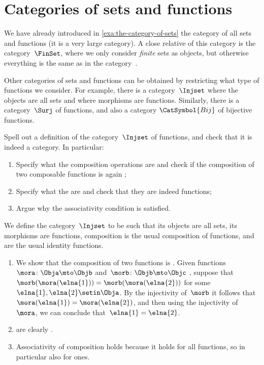 
\section{Categories of sets and functions}

We have already introduced in \cref{exa:the-category-of-sets} the category of all sets and functions (it is a very large category).
A close relative of this category is the category~$\FinSet$, where we only consider \emph{finite} sets as objects, but otherwise everything is the same as in the category~\Set.

Other categories of sets and functions can be obtained by restricting what type of functions we consider.
For example, there is a category~$\Injset$ where the objects are all sets and where morphisms are  functions.
Similarly, there is a category~$\Surj$ of  functions, and also a category $\CatSymbol{Bij}$ of bijective functions.

\begin{exercise}
    Spell out a definition of the category~$\Injset$ of  functions, and check that it is indeed a category.
    In particular:
    \begin{enumerate}
        \item Specify what the composition operations are and check if the composition of two composable  functions is again ;
        \item Specify what the   are and check that they are indeed  functions;
        \item Argue why the associativity condition is satisfied.
    \end{enumerate}
\end{exercise}

\begin{solution}
    We define the category~$\Injset$ to be such that its objects are all sets, its morphisms are  functions, composition is the usual composition of functions, and  are the usual identity functions.
    \begin{enumerate}
        \item We show that the composition of two  functions is .
              Given functions~$\mora \colon \Obja \mto \Objb$ and~$\morb \colon \Objb \mto \Objc$ , suppose that~$\morb(\mora (\elna{1})) = \morb(\mora (\elna{2}))$ for some~$\elna{1}, \elna{2} \setin \Obja$.
              By the injectivity of~$\morb$ it follows that~$\mora (\elna{1}) = \mora (\elna{2})$, and then using the injectivity of~$\mora$, we can conclude that~$\elna{1} = \elna{2}$.
        \item {} are clearly .
        \item Associativity of composition holds because it holds for all functions, so in particular also for  ones.
    \end{enumerate}
\end{solution}

